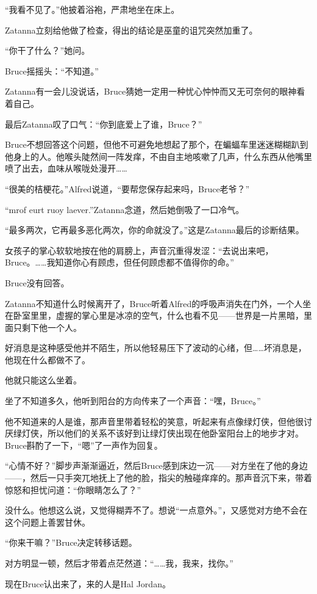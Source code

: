 \documentclass[../main.tex]{subfiles}
\begin{document}
“我看不见了。”他披着浴袍，严肃地坐在床上。

Zatanna立刻给他做了检查，得出的结论是巫童的诅咒突然加重了。

“你干了什么？”她问。

Bruce摇摇头：“不知道。”

Zatanna有一会儿没说话，Bruce猜她一定用一种忧心忡忡而又无可奈何的眼神看着自己。

最后Zatanna叹了口气：“你到底爱上了谁，Bruce？”

Bruce不想回答这个问题，但他不可避免地想起了那个，在蝙蝠车里迷迷糊糊趴到他身上的人。他喉头陡然间一阵发痒，不由自主地咳嗽了几声，什么东西从他嘴里喷了出去，血味从喉咙处漫开\ldots\ldots{}

“很美的桔梗花。”Alfred说道，“要帮您保存起来吗，Bruce老爷？”

“mrof eurt ruoy laever.”Zatanna念道，然后她倒吸了一口冷气。

“最多两次，它再最多恶化两次，你的命就没了。”这是Zatanna最后的诊断结果。

女孩子的掌心软软地按在他的肩膀上，声音沉重得发涩：“去说出来吧，Bruce。\ldots\ldots 我知道你心有顾虑，但任何顾虑都不值得你的命。”

Bruce没有回答。

Zatanna不知道什么时候离开了，Bruce听着Alfred的呼吸声消失在门外，一个人坐在卧室里里，虚握的掌心里是冰凉的空气，什么也看不见——世界是一片黑暗，里面只剩下他一个人。

好消息是这种感受他并不陌生，所以他轻易压下了波动的心绪，但\ldots\ldots 坏消息是，他现在什么都做不了。

他就只能这么坐着。

坐了不知道多久，他听到阳台的方向传来了一个声音：“嘿，Bruce。”

他不知道来的人是谁，那声音里带着轻松的笑意，听起来有点像绿灯侠，但他很讨厌绿灯侠，所以他们的关系不该好到让绿灯侠出现在他卧室阳台上的地步才对。Bruce斟酌了一下，“嗯”了一声作为回复。

“心情不好？”脚步声渐渐逼近，然后Bruce感到床边一沉——对方坐在了他的身边——，然后一只手突兀地抚上了他的脸，指尖的触碰痒痒的。那声音沉下来，带着惊怒和担忧问道：“你眼睛怎么了？”

没什么。他想这么说，又觉得糊弄不了。想说“一点意外。”，又感觉对方绝不会在这个问题上善罢甘休。

“你来干嘛？”Bruce决定转移话题。

对方明显一顿，然后才带着点茫然道：“\ldots\ldots 我，我来，找你。”

现在Bruce认出来了，来的人是Hal Jordan。
\end{document}
